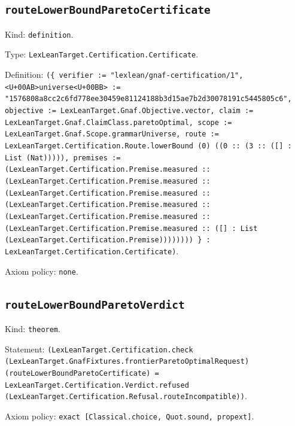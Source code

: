 \documentclass[11pt]{article}
\begin{document}
\subsection*{\texttt{routeLowerBoundParetoCertificate}}
\noindent Kind: \texttt{definition}.\par
\noindent Type: \texttt{LexLeanTarget.Certification.Certificate}.\par
\noindent Definition: \texttt{(\{ verifier := "lexlean/gnaf-certification/1", <U+00AB>universe<U+00BB> := "1576808a8cc2c6fd778ee30459e81124188b3d15ae7b2d30078191c5445805c6", objective := LexLeanTarget.Gnaf.Objective.vector, claim := LexLeanTarget.Gnaf.ClaimClass.paretoOptimal, scope := LexLeanTarget.Gnaf.Scope.grammarUniverse, route := LexLeanTarget.Certification.Route.lowerBound (0) ((0 :: (3 :: ([] : List (Nat))))), premises := (LexLeanTarget.Certification.Premise.measured :: (LexLeanTarget.Certification.Premise.measured :: (LexLeanTarget.Certification.Premise.measured :: (LexLeanTarget.Certification.Premise.measured :: (LexLeanTarget.Certification.Premise.measured :: (LexLeanTarget.Certification.Premise.measured :: ([] : List (LexLeanTarget.Certification.Premise)))))))) \} : LexLeanTarget.Certification.Certificate)}.\par
\noindent Axiom policy: \texttt{none}.\par
\subsection*{\texttt{routeLowerBoundParetoVerdict}}
\noindent Kind: \texttt{theorem}.\par
\noindent Statement: \texttt{(LexLeanTarget.Certification.check (LexLeanTarget.GnafFixtures.frontierParetoOptimalRequest) (routeLowerBoundParetoCertificate) = LexLeanTarget.Certification.Verdict.refused (LexLeanTarget.Certification.Refusal.routeIncompatible))}.\par
\noindent Axiom policy: \texttt{exact [Classical.choice, Quot.sound, propext]}.\par
\end{document}
